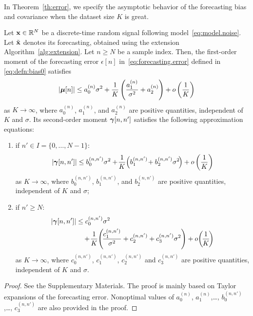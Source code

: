 In Theorem~\ref{th:error}, we specify the asymptotic behavior of the forecasting bias and covariance when the dataset size $K$ is great.
\begin{theorem}
\label{th:error}
Let ${\mathbf x}\in{\mathbb R}^N$ be a discrete-time random signal following model~\eqref{eq:model.noise}. Let $\tilde{{\mathbf x}}$ denotes its forecasting, obtained using the extension Algorithm~\ref{alg:extension}. Let $n\geq N$ be a sample index. Then, the first-order moment of the forecasting error $\epsilon[n]$ in~\eqref{eq:forecasting.error} defined in \eqref{eq:defn:bias0} satisfies
\begin{equation}
\left|\bmu[n]\right| \leq a^{(n)}_0\sigma^2 + \dfrac1K \left( \dfrac{a^{(n)}_1}{\sigma^2} + a^{(n)}_2 \right) + o\left( \dfrac1K \right)
\label{eq:mean.error}
\end{equation}
as $K\to\infty$, where $a^{(n)}_0$, $a^{(n)}_1$, and $a^{(n)}_2$ are positive quantities, independent of $K$ and $\sigma$.
Its second-order moment $\boldsymbol{\gamma}[n,n']$ satisfies the following approximation equations:
\begin{enumerate}[label=(\roman*)]
\item if $n'\in I=\{0,\ldots,N-1\}$:
\begin{equation}
\left|\bgamma[n,n']\right|\leq b^{(n,n')}_0\sigma^2 + \!\dfrac1K\! \left( b^{(n,n')}_1\! + b^{(n,n')}_2\sigma^2 \! \right) + o\left( \dfrac1K \right)
\label{eq:cov.error.1}
\end{equation}
as $K\to\infty$, where $b^{(n,n')}_0$, $b^{(n,n')}_1$, and $b^{(n,n')}_2$ are positive quantities, independent of $K$ and $\sigma$;
\item if $n'\geq N$:
\begin{align}
\nonumber
\left|\bgamma[n,n']\right| &\leq c^{(n,n')}_0\sigma^2 \\
&\hspace{10pt} + \!\dfrac1K\! \left(\! \dfrac{c^{(n,n')}_1}{\sigma^2} + c^{(n,n')}_2 + c^{(n,n')}_3\sigma^2 \right) + o\!\left( \!\dfrac1K \!\right)
\label{eq:cov.error.2}
\end{align}
as $K\to\infty$, where $c^{(n,n')}_0$, $c^{(n,n')}_1$, $c^{(n,n')}_2$ and $c^{(n,n')}_3$ are positive quantities, independent of $K$ and $\sigma$.
\end{enumerate}
\end{theorem}

\begin{proof}
See the Supplementary Materials. The proof is mainly based on Taylor expansions of the forecasting error. Nonoptimal values of $a^{(n)}_0$, $a^{(n)}_1$,\dots, $b^{(n,n')}_0$,\dots, $c^{(n,n')}_3$ are also provided in the proof. 
\end{proof}

